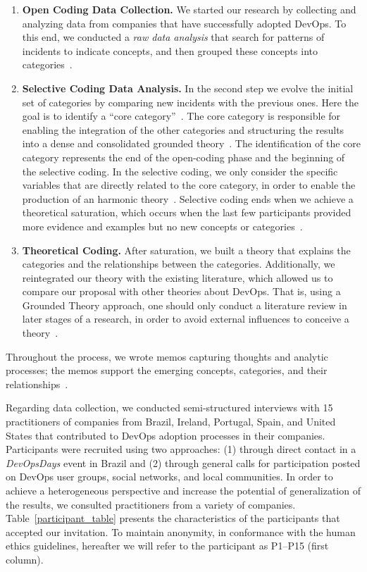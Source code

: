 \begin{enumerate}[label=(\Alph*)]
\item {\bf Open Coding Data Collection.} We started our research
  by collecting and analyzing data from companies that have successfully adopted DevOps.
  To this end, we conducted a \emph{raw data analysis} that search for patterns of
  incidents to indicate concepts,  and then grouped these concepts into
  categories~\cite{stol2016grounded}.

\item {\bf Selective Coding Data Analysis.} In the second step we evolve
  the initial set of
  categories by comparing new incidents with the previous ones. Here the goal is
  to identify a ``core category''~\cite{stol2016grounded}.
  The core category is responsible for enabling the integration of the other
  categories and structuring the results into a dense and consolidated grounded
  theory~\cite{jantunen2014using}. The identification of the core category
  represents the end of the open-coding phase and the beginning of the selective coding.
  In the selective coding, we only consider the specific variables that are directly
  related to the core category, in order to enable the production of an harmonic
  theory~\cite{coleman2007using,hoda2011impact}. Selective coding ends when we
  achieve a theoretical saturation, which occurs when the last few
  participants provided more evidence and examples but no new concepts or
  categories~\cite{glase1967discovery}.

\item {\bf Theoretical Coding.} After saturation, we built a theory that
explains the categories and the relationships between the categories.
Additionally, we reintegrated our theory with the existing literature, which allowed us to compare our proposal
 with other theories about DevOps. That is, using a Grounded Theory approach,
 one should only conduct a literature review in later stages of a research,
in order to avoid external influences to conceive a theory~\cite{adolph2012reconciling}.

\end{enumerate}

Throughout the process, we wrote memos capturing thoughts and analytic
processes; the memos support the emerging concepts, categories, and their
relationships~\cite{adolph2012reconciling}.

Regarding data collection, we conducted semi-structured interviews with 15 practitioners of companies from
Brazil, Ireland, Portugal, Spain, and United States that
contributed to DevOps adoption processes in their companies. Participants
were recruited using two approaches: (1) through direct contact in a \emph{DevOpsDays}
event in Brazil and (2) through  general
calls for participation posted on DevOps user groups, social networks,
and local communities. In order to achieve a heterogeneous perspective
and increase the potential of generalization of the results,
we consulted practitioners from a variety of companies.
Table~\ref{participant_table} presents the characteristics of the participants
that accepted our invitation.
To maintain anonymity, in conformance with the human ethics guidelines,
hereafter we will refer to the participant as P1--P15 (first column).

